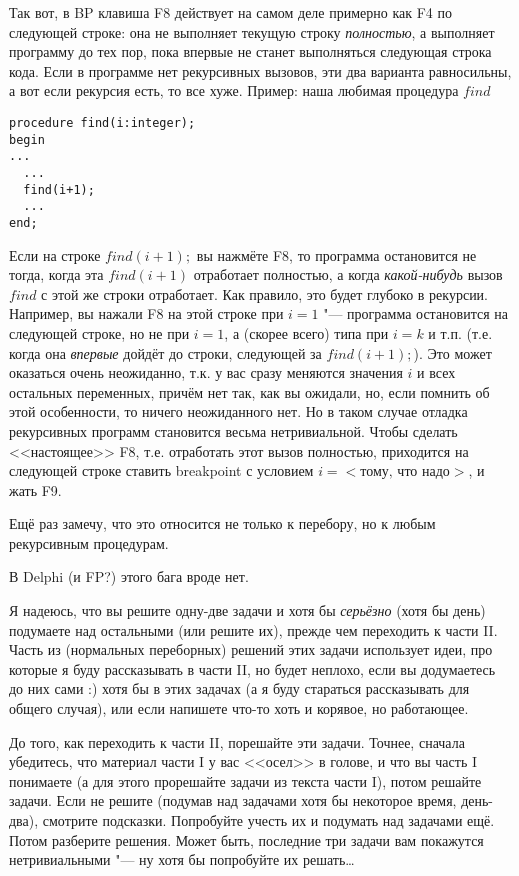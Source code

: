 Так вот, в BP клавиша F8 действует на самом деле примерно как F4 по следующей 
строке: она не выполняет текущую строку \textit{полностью}, а выполняет программу до тех 
пор, пока впервые не станет выполняться следующая строка кода. Если в программе 
нет рекурсивных вызовов, эти два варианта равносильны, а вот если рекурсия есть, 
то все хуже. Пример: наша любимая процедура $find$
\begin{codesampleo}\begin{verbatim}
procedure find(i:integer);
begin
...
  ...
  find(i+1);
  ...
end;
\end{verbatim}
\end{codesampleo}
Если на строке $find(i+1);$ вы нажмёте F8, то программа остановится не тогда, 
когда эта $find(i+1)$ отработает полностью, а когда \textit{какой-нибудь} вызов $find$ с 
этой же строки отработает. Как правило, это будет глубоко в рекурсии. Например, 
вы нажали F8 на этой строке при $i=1$ "--- программа остановится на следующей строке, но не 
при $i=1$, а (скорее всего) типа при $i=k$ и т.п. (т.е. когда она \textit{впервые} дойдёт до 
строки, следующей за $find(i+1);$). Это может оказаться очень  
неожиданно, т.к. у вас сразу меняются значения $i$ и всех остальных переменных, 
причём нет так, как вы ожидали, но, если помнить об этой особенности, то ничего 
неожиданного нет. Но в таком случае отладка рекурсивных программ становится 
весьма нетривиальной. Чтобы сделать <<настоящее>> F8, т.е. отработать этот вызов 
полностью, приходится на следующей строке ставить breakpoint с условием 
$i=<\mbox{тому, что надо}>$, и жать F9.

Ещё раз замечу, что это относится не только к перебору, но к любым рекурсивным 
процедурам.

В Delphi (и FP?) этого бага вроде нет.

Я надеюсь, что вы решите одну-две задачи и хотя бы \textit{серьёзно} (хотя бы день) 
подумаете над остальными (или решите их), прежде чем переходить к части II.
Часть из (нормальных переборных) решений этих задачи использует идеи, про которые я буду 
рассказывать в части II, но будет неплохо, если вы додумаетесь до них сами :) хотя бы в этих 
задачах (а я буду стараться рассказывать для общего случая), или если напишете что-то хоть и 
корявое, но работающее.

До того, как переходить к части II, порешайте эти задачи. Точнее, сначала убедитесь, что 
материал части I у вас <<осел>> в голове, и что вы часть I понимаете (а для этого прорешайте 
задачи из текста части I), потом решайте задачи. Если не решите (подумав над задачами хотя бы 
некоторое время, день-два), смотрите подсказки. Попробуйте учесть их и подумать 
над задачами ещё. Потом разберите решения. Может быть, последние три задачи вам 
покажутся нетривиальными "--- ну хотя бы попробуйте их решать\dots


